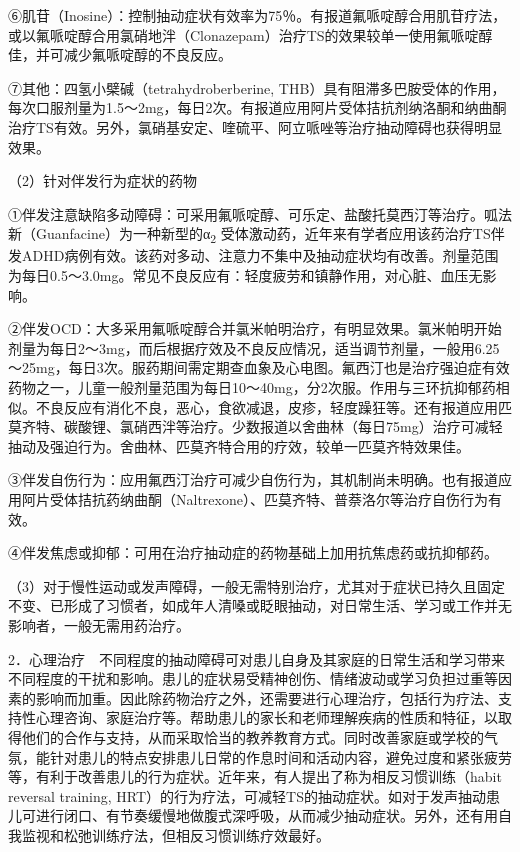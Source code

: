 ⑥肌苷（Inosine）：控制抽动症状有效率为75％。有报道氟哌啶醇合用肌苷疗法，或以氟哌啶醇合用氯硝地泮（Clonazepam）治疗TS的效果较单一使用氟哌啶醇佳，并可减少氟哌啶醇的不良反应。

⑦其他：四氢小檗碱（tetrahydroberberine,
THB）具有阻滞多巴胺受体的作用，每次口服剂量为1.5～2mg，每日2次。有报道应用阿片受体拮抗剂纳洛酮和纳曲酮治疗TS有效。另外，氯硝基安定、喹硫平、阿立哌唑等治疗抽动障碍也获得明显效果。

（2）针对伴发行为症状的药物

①伴发注意缺陷多动障碍：可采用氟哌啶醇、可乐定、盐酸托莫西汀等治疗。呱法新（Guanfacine）为一种新型的α\textsubscript{2}
受体激动药，近年来有学者应用该药治疗TS伴发ADHD病例有效。该药对多动、注意力不集中及抽动症状均有改善。剂量范围为每日0.5～3.0mg。常见不良反应有：轻度疲劳和镇静作用，对心脏、血压无影响。

②伴发OCD：大多采用氟哌啶醇合并氯米帕明治疗，有明显效果。氯米帕明开始剂量为每日2～3mg，而后根据疗效及不良反应情况，适当调节剂量，一般用6.25～25mg，每日3次。服药期间需定期查血象及心电图。氟西汀也是治疗强迫症有效药物之一，儿童一般剂量范围为每日10～40mg，分2次服。作用与三环抗抑郁药相似。不良反应有消化不良，恶心，食欲减退，皮疹，轻度躁狂等。还有报道应用匹莫齐特、碳酸锂、氯硝西泮等治疗。少数报道以舍曲林（每日75mg）治疗可减轻抽动及强迫行为。舍曲林、匹莫齐特合用的疗效，较单一匹莫齐特效果佳。

③伴发自伤行为：应用氟西汀治疗可减少自伤行为，其机制尚未明确。也有报道应用阿片受体拮抗药纳曲酮（Naltrexone）、匹莫齐特、普萘洛尔等治疗自伤行为有效。

④伴发焦虑或抑郁：可用在治疗抽动症的药物基础上加用抗焦虑药或抗抑郁药。

（3）对于慢性运动或发声障碍，一般无需特别治疗，尤其对于症状已持久且固定不变、已形成了习惯者，如成年人清嗓或眨眼抽动，对日常生活、学习或工作并无影响者，一般无需用药治疗。

2．心理治疗　不同程度的抽动障碍可对患儿自身及其家庭的日常生活和学习带来不同程度的干扰和影响。患儿的症状易受精神创伤、情绪波动或学习负担过重等因素的影响而加重。因此除药物治疗之外，还需要进行心理治疗，包括行为疗法、支持性心理咨询、家庭治疗等。帮助患儿的家长和老师理解疾病的性质和特征，以取得他们的合作与支持，从而采取恰当的教养教育方式。同时改善家庭或学校的气氛，能针对患儿的特点安排患儿日常的作息时间和活动内容，避免过度和紧张疲劳等，有利于改善患儿的行为症状。近年来，有人提出了称为相反习惯训练（habit
reversal training,
HRT）的行为疗法，可减轻TS的抽动症状。如对于发声抽动患儿可进行闭口、有节奏缓慢地做腹式深呼吸，从而减少抽动症状。另外，还有用自我监视和松弛训练疗法，但相反习惯训练疗效最好。